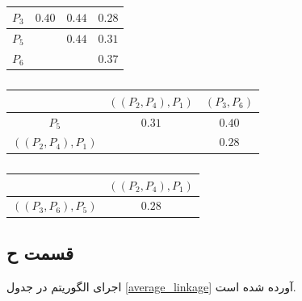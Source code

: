 \documentclass[12pt, a4paper]{article}
\begin{document}
\begin{latin}
\begin{table}[h]
\begin{subtable}{0.45\linewidth}
\begin{tabular}{c|c|c|c}
                \hline
                $P_3$ & $0.40$ & \cellcolor{purple!30} $0.44$ & $0.28$              \\
                \hline
                $P_5$ &        & $0.44$                       & $0.31$              \\
                \hline
                $P_6$ &        &                              & $0.37$              \\
            \end{tabular}
        \end{subtable}
        \hfill
        \begin{subtable}{0.45\linewidth}
            \caption{}
            \begin{tabular}{c|c|c}
                & $((P_2, P_4), P_1)$ & $(P_3, P_6)$ \\
                \hline
                $P_5$ & $0.31$ & \cellcolor{purple!30}$0.40$\\
                \hline
                $((P_2, P_4), P_1)$ & & $0.28$\\
            \end{tabular}
        \end{subtable}
        \newline
        \begin{subtable}{0.45\linewidth}
            \caption{}
            \begin{tabular}{c|c}
                & $((P_2, P_4), P_1)$ \\
                \hline
                $((P_3, P_6), P_5)$ & \cellcolor{purple!30} $0.28$ \\
            \end{tabular}
        \end{subtable}
    \end{table}
\end{latin}

\clearpage
\subsection*{قسمت ح}

اجرای الگوریتم  در جدول \ref{average_linkage} آورده شده است.
\end{document}
